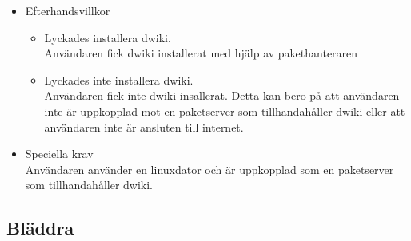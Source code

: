\begin{itemize}
	\item Efterhandsvillkor
	\begin{itemize}
	\item Lyckades installera dwiki.
	\\Användaren fick dwiki installerat med hjälp av pakethanteraren
	\item Lyckades inte installera dwiki.
	\\Användaren fick inte dwiki insallerat. Detta kan bero på att användaren inte är uppkopplad mot en paketserver som tillhandahåller dwiki eller att användaren inte är ansluten till internet.
	\end{itemize}
	\item Speciella krav
	\\Användaren använder en linuxdator och är uppkopplad som en paketserver som tillhandahåller dwiki.
\end{itemize}

\subsection{Bläddra}

